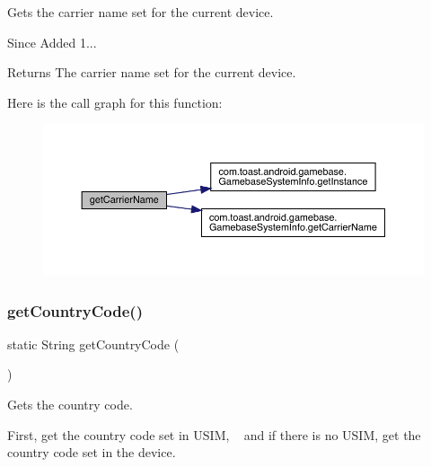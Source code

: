 Gets the carrier name set for the current device. 

\begin{DoxySince}{Since}
Added 1... 
\end{DoxySince}
\begin{DoxyReturn}{Returns}
The carrier name set for the current device. 
\end{DoxyReturn}
Here is the call graph for this function\+:
\nopagebreak
\begin{figure}[H]
\begin{center}
\leavevmode
\includegraphics[width=350pt]{classcom_1_1toast_1_1android_1_1gamebase_1_1_gamebase_acd4bf4656730a81853332a4a551e5e9f_cgraph}
\end{center}
\end{figure}
\mbox{\label{classcom_1_1toast_1_1android_1_1gamebase_1_1_gamebase_a57662f504668587ba2a1d667a48c9732}} 
\subsubsection{\texorpdfstring{get\+Country\+Code()}{getCountryCode()}}
{\footnotesize\ttfamily static String get\+Country\+Code (\begin{DoxyParamCaption}{ }\end{DoxyParamCaption})\hspace{0.3cm}{\ttfamily [static]}}



Gets the country code. 

First, get the country code set in U\+S\+IM, ~\newline
 and if there is no U\+S\+IM, get the country code set in the device.

